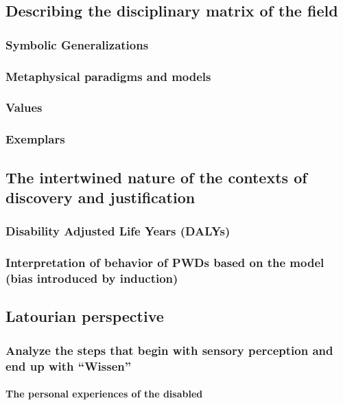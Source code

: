 \documentclass{lps}
\begin{document}
\subsection{Describing the disciplinary matrix of the field}

\subsubsection{Symbolic Generalizations}

\subsubsection{Metaphysical paradigms and models}

\subsubsection{Values}

\subsubsection{Exemplars}

\subsection{The intertwined nature of the contexts of discovery and
justification}

\subsubsection{Disability Adjusted Life Years (DALYs)}

\subsubsection{Interpretation of behavior of PWDs based on the model (bias
introduced by induction)}

\subsection{Latourian perspective}

\subsubsection{Analyze the steps that begin with sensory perception and end up
with “Wissen”}

\paragraph{The personal experiences of the disabled}
\end{document}
